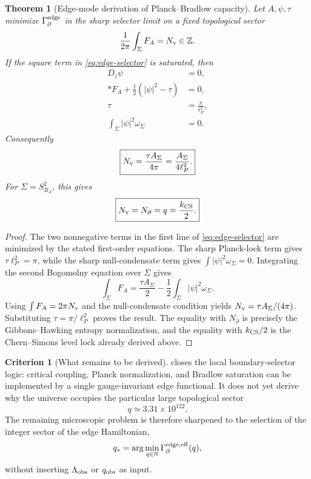 \documentclass[aps,prd,reprint,nofootinbib,superscriptaddress,floatfix]{revtex4-2}
\numberwithin{equation}{section}
\theoremstyle{definition}
\newtheorem{criterion}{Criterion}[section]
\theoremstyle{plain}
\newtheorem{theorem}{Theorem}[section]
\begin{document}
\begin{theorem}[Edge-mode derivation of Planck--Bradlow capacity]
\label{thm:edge-mode-capacity}
Let \(A,\psi,\tau\) minimize \(\Gamma_{\partial}^{\rm edge}\) in the sharp
selector limit on a fixed topological sector
\[
\frac{1}{2\pi}\int_\Sigma F_A=N_{\rm v}\in\mathbb Z .
\]
If the square term in \cref{eq:edge-selector} is saturated, then
\begin{equation}
\begin{aligned}
D_{\bar z}\psi&=0,\\
*F_A+\frac12(|\psi|^2-\tau)&=0,\\
\tau&=\frac{\pi}{\ell_P^2},\\
\int_\Sigma|\psi|^2\omega_\Sigma&=0 .
\end{aligned}
\end{equation}
Consequently
\begin{equation}
\boxed{
N_{\rm v}
=
\frac{\tau A_\Sigma}{4\pi}
=
\frac{A_\Sigma}{4\ell_P^2}.
}
\end{equation}
For \(\Sigma=S^2_{R_\Lambda}\), this gives
\begin{equation}
\boxed{
N_{\rm v}=N_\partial=q=\frac{k_{\rm CS}}2 .
}
\end{equation}
\end{theorem}

\begin{proof}
The two nonnegative terms in the first line of
\cref{eq:edge-selector} are minimized by the stated first-order equations.
The sharp Planck-lock term gives \(\tau\ell_P^2=\pi\), while the sharp
null-condensate term gives \(\int|\psi|^2\omega_\Sigma=0\).
Integrating the second Bogomolny equation over \(\Sigma\) gives
\[
\int_\Sigma F_A
=
\frac{\tau A_\Sigma}{2}
-
\frac12\int_\Sigma|\psi|^2\omega_\Sigma .
\]
Using \(\int F_A=2\pi N_{\rm v}\) and the null-condensate condition yields
\(N_{\rm v}=\tau A_\Sigma/(4\pi)\).  Substituting
\(\tau=\pi/\ell_P^2\) proves the result.  The equality with
\(N_\partial\) is precisely the Gibbons--Hawking entropy normalization, and
the equality with \(k_{\rm CS}/2\) is the Chern--Simons level lock already
derived above.
\end{proof}

\begin{criterion}[What remains to be derived]
\label{crit:edge-remaining}
 closes the local boundary-selector logic:
critical coupling, Planck normalization, and Bradlow saturation can be
implemented by a single gauge-invariant edge functional.  It does not yet
derive why the universe occupies the particular large topological sector
\[
q\simeq3.31\times10^{122}.
\]
The remaining microscopic problem is therefore sharpened to the selection of
the integer sector of the edge Hamiltonian,
\begin{equation}
q_*=\arg\min_{q\in\mathbb N}\Gamma_{\partial}^{\rm edge,eff}(q),
\end{equation}
without inserting \(\Lambda_{\rm obs}\) or \(q_{\rm obs}\) as input.
\end{criterion}
\end{document}
